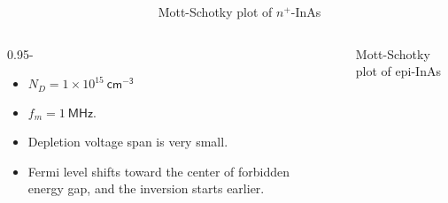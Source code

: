 \documentclass[final]{beamer}
\newcommand{\figfont}{\normalsize} %
\begin{document}
\begin{poster}
\begin{columns}[c]
        \begin{column}{0.005\columnwidth}
        \end{column}
        
        \begin{column}{\figwidth}
           \centering
           \figfont
           
           \caption{\hskip50pt Mott-Schotky plot of $n^+\!$-InAs}  
        \end{column}
\end{columns}
   
\begin{columns}[c]
        \begin{column}{0.95\columnwidth-\figwidth}
            \begin{itemize}    \itemsep15pt          
                \item $N_D = 1\times10^{15}\ \mathsf{cm^{-3}}$
                \item $f_m=1\ \mathsf{MHz}$.
                \item Depletion voltage span is very small.
                \item Fermi level shifts toward the
                center of forbidden energy gap, and the inversion starts earlier.
               \end{itemize}
        \end{column}
        
        \begin{column}{0.005\columnwidth}
        \end{column}   
                   
        \begin{column}{\figwidth}
             \vspace{1ex} 
             \centering
             \figfont
             
             \caption{\hskip50pt Mott-Schotky plot of epi-InAs}  
        \end{column}
\end{columns}	



\end{poster}
\end{document}
